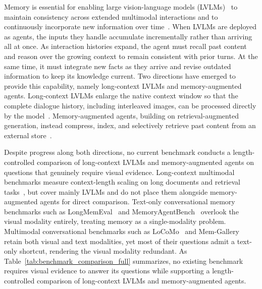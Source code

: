 \documentclass{article}
\begin{document}
Memory is essential for enabling large vision-language models (LVLMs)~\citep{seed2_0,singh2025openaigpt5card} to maintain consistency across extended multimodal interactions and to continuously incorporate new information over time~\cite{openai2023gpt4,anthropic2024claude3,team2024gemini}. When LVLMs are deployed as agents, the inputs they handle accumulate incrementally rather than arriving all at once. As interaction histories expand, the agent must recall past content and reason over the growing context to remain consistent with prior turns. At the same time, it must integrate new facts as they arrive and revise outdated information to keep its knowledge current. Two directions have emerged to provide this capability, namely long-context LVLMs and memory-augmented agents. Long-context LVLMs enlarge the native context window so that the complete dialogue history, including interleaved images, can be processed directly by the model~\cite{team2024gemini,seed1_8,anthropic2025claudesonnet45card}. Memory-augmented agents, building on retrieval-augmented generation, instead compress, index, and selectively retrieve past content from an external store~\cite{packer2024memgptllmsoperatingsystems,mem0,jin2024long}.

Despite progress along both directions, no current benchmark conducts a length-controlled comparison of long-context LVLMs and memory-augmented agents on questions that genuinely require visual evidence. Long-context multimodal benchmarks measure context-length scaling on long documents and retrieval tasks~\cite{mmlongbench,wang2024needlemultimodalhaystack,ma2024mmlongbenchdocbenchmarkinglongcontextdocument}, but cover mainly LVLMs and do not place them alongside memory-augmented agents for direct comparison. Text-only conversational memory benchmarks such as LongMemEval~\cite{wu2025longmemevalbenchmarkingchatassistants} and MemoryAgentBench~\cite{memoryagentbench} overlook the visual modality entirely, treating memory as a single-modality problem. Multimodal conversational benchmarks such as LoCoMo~\cite{maharana2024evaluatinglongtermconversationalmemory} and Mem-Gallery~\cite{memgallery} retain both visual and text modalities, yet most of their questions admit a text-only shortcut, rendering the visual modality redundant. As Table~\ref{tab:benchmark_comparison_full} summarizes, no existing benchmark requires visual evidence to answer its questions while supporting a length-controlled comparison of long-context LVLMs and memory-augmented agents.
\end{document}
